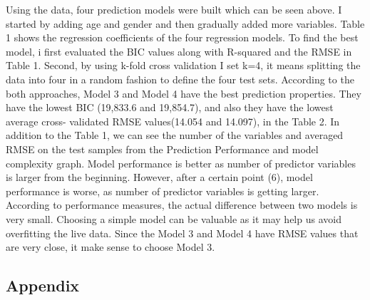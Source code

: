 \documentclass[
]{article}
\begin{document}
Using the data, four prediction models were built which can be seen
above. I started by adding age and gender and then gradually added more
variables. Table 1 shows the regression coefficients of the four
regression models. To find the best model, i first evaluated the BIC
values along with R-squared and the RMSE in Table 1. Second, by using
k-fold cross validation I set k=4, it means splitting the data into four
in a random fashion to define the four test sets. According to the both
approaches, Model 3 and Model 4 have the best prediction properties.
They have the lowest BIC (19,833.6 and 19,854.7), and also they have the
lowest average cross- validated RMSE values(14.054 and 14.097), in the
Table 2. In addition to the Table 1, we can see the number of the
variables and averaged RMSE on the test samples from the Prediction
Performance and model complexity graph. Model performance is better as
number of predictor variables is larger from the beginning. However,
after a certain point (6), model performance is worse, as number of
predictor variables is getting larger. According to performance
measures, the actual difference between two models is very small.
Choosing a simple model can be valuable as it may help us avoid
overfitting the live data. Since the Model 3 and Model 4 have RMSE
values that are very close, it make sense to choose Model 3.

\pagebreak

\hypertarget{appendix}{%
\subsection{Appendix}\label{appendix}}

\begingroup\fontsize{7}{9}\selectfont
\end{document}
